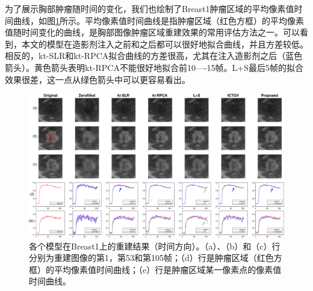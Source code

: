 为了展示胸部肿瘤随时间的变化，我们也绘制了Breast1肿瘤区域的平均像素值时间曲线，如图\ref{fig:breast1_time}所示。平均像素值时间曲线是指肿瘤区域（红色方框）的平均像素值随时间变化的曲线，是胸部图像肿瘤区域重建效果的常用评估方法之一。可以看到，本文的模型在造影剂注入之前和之后都可以很好地拟合曲线，并且方差较低。相反的，kt-SLR和kt-RPCA拟合曲线的方差很高，尤其在注入造影剂之后（蓝色箭头）。黄色箭头表明kt-RPCA不能很好地拟合前10—-15帧。L+S最后5帧的拟合效果很差，这一点从绿色箭头中可以更容易看出。
\begin{figure}
\centering
\includegraphics[width=1\textwidth]{img/tgvnn/figure6_breast1_frames.eps}
\caption{各个模型在Breast1上的重建结果（时间方向）。（a）、（b）和（c）行分别为重建图像的第1，第53和第105帧；（d）行是肿瘤区域（红色方框）的平均像素值时间曲线；（e）行是肿瘤区域某一像素点的像素值时间曲线。}
\label{fig:breast1_time}
\end{figure} 

